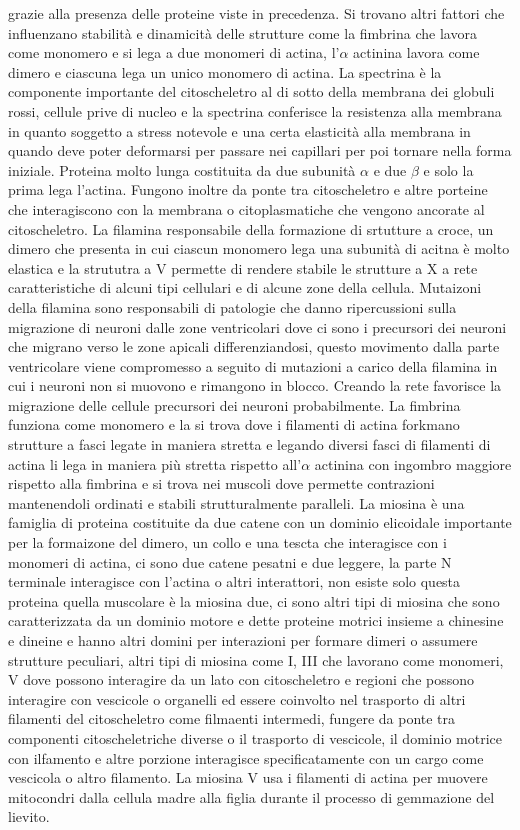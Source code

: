 grazie alla presenza delle proteine viste in precedenza. Si trovano altri fattori che influenzano stabilit\`a e dinamicit\`a delle strutture come la fimbrina che lavora come monomero e 
si lega a due monomeri di actina, l'$\alpha$ actinina lavora come dimero e ciascuna lega un unico monomero di actina. La spectrina \`e la componente importante del citoscheletro al di
sotto della membrana dei globuli rossi, cellule prive di nucleo e la spectrina conferisce la resistenza alla membrana  in quanto soggetto a stress notevole e una certa elasticit\`a alla
membrana in quando deve poter deformarsi per passare nei capillari per poi tornare nella forma iniziale. Proteina molto lunga costituita da due subunit\`a $\alpha$ e due $\beta$ e solo
la prima lega l'actina. Fungono inoltre da ponte tra citoscheletro e altre porteine che interagiscono con la membrana o citoplasmatiche che vengono ancorate al citoscheletro. La filamina
responsabile della formazione di srtutture a croce, un dimero che presenta in cui ciascun monomero lega una subunit\`a di acitna \`e molto elastica e la strututra a V permette di rendere
stabile le strutture a X a rete caratteristiche di alcuni tipi cellulari e di alcune zone della cellula. Mutaizoni della filamina sono responsabili di patologie che danno ripercussioni 
sulla migrazione di neuroni dalle zone ventricolari dove ci sono i precursori dei neuroni che migrano verso le zone apicali differenziandosi, questo movimento dalla parte ventricolare 
viene compromesso a seguito di mutazioni a carico della filamina in cui i neuroni non si muovono e rimangono in blocco. Creando la rete favorisce la migrazione delle cellule precursori 
dei neuroni probabilmente. La fimbrina funziona come monomero e la si trova dove i filamenti di actina forkmano strutture a fasci legate in maniera stretta e legando diversi fasci di 
filamenti di actina li lega in maniera pi\`u stretta rispetto all'$\alpha$ actinina con ingombro maggiore rispetto alla fimbrina e si trova nei muscoli dove permette contrazioni 
mantenendoli ordinati e stabili strutturalmente paralleli. La miosina \`e una famiglia di proteina costituite da due catene con un dominio elicoidale importante per la formaizone del 
dimero, un collo e una tescta che interagisce con i monomeri di actina, ci sono due catene pesatni e due leggere, la parte N terminale interagisce con l'actina o altri interattori, 
non esiste solo questa proteina quella muscolare \`e la miosina due, ci sono altri tipi di miosina che sono caratterizzata da un dominio motore e dette proteine motrici insieme a 
chinesine e dineine e hanno altri domini per interazioni per formare dimeri o assumere strutture peculiari, altri tipi di miosina come I, III che lavorano come monomeri, V dove possono
interagire da un lato con citoscheletro e regioni che possono interagire con vescicole o organelli ed essere coinvolto nel trasporto di altri filamenti del citoscheletro come filmaenti 
intermedi, fungere da ponte tra componenti citoscheletriche diverse o il trasporto di vescicole, il dominio motrice con ilfamento e altre porzione interagisce specificatamente con un
cargo come vescicola o altro filamento. La miosina V usa i filamenti di actina per muovere mitocondri dalla cellula madre alla figlia durante il processo di gemmazione del lievito. 
